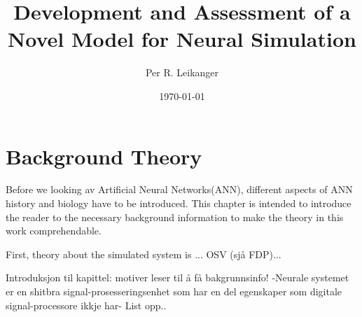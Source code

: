 \documentclass[b5paper,11 pt]{report}
\author{Per R. Leikanger}
\title{Development and Assessment of a Novel Model for Neural Simulation}
\date{\today}
\begin{document}
   



\pagestyle{empty} %

\maketitle







\pagestyle{empty} 

\tableofcontents %
\cleardoublepage %

\setcounter{page}{1} %
\pagestyle{plain} %















\chapter{Background Theory}
	Before we looking av Artificial Neural Networks(ANN), different aspects of ANN history and biology have to be introduced.
	This chapter is intended to introduce the reader to the necessary background information to make the theory in this work comprehendable.

	First, theory about the simulated system is ... OSV (sjå FDP)...

	Introduksjon til kapittel: motiver leser til å få bakgrunnsinfo!
	-Neurale systemet er en shitbra signal-prosesseringsenhet som har en del egenskaper som digitale signal-processore ikkje har- List opp..
	
	
% 	




%	
%	
%	
%	
%	
%	
%
% 	
\end{document}
